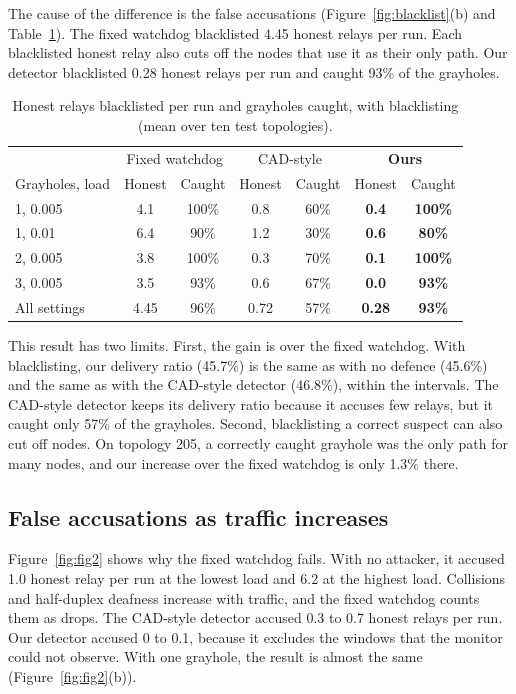 \documentclass[11pt]{article}
\begin{document}
\noindent
The cause of the difference is the false accusations (Figure~\ref{fig:blacklist}(b) and Table~\ref{tab:blacklist-acc}).
The fixed watchdog blacklisted 4.45 honest relays per run.
Each blacklisted honest relay also cuts off the nodes that use it as their only path.
Our detector blacklisted 0.28 honest relays per run and caught 93\% of the grayholes.

\begin{table}[htbp]
\centering\small
\caption{Honest relays blacklisted per run and grayholes caught, with blacklisting (mean over ten test topologies).}\label{tab:blacklist-acc}
\begin{tabular}{l c c c c c c}
\toprule
 & \multicolumn{2}{c}{Fixed watchdog} & \multicolumn{2}{c}{CAD-style} & \multicolumn{2}{c}{\textbf{Ours}} \\
Grayholes, load & Honest & Caught & Honest & Caught & Honest & Caught \\
\midrule
1, 0.005 & 4.1 & 100\% & 0.8 & 60\% & \textbf{0.4} & \textbf{100\%} \\
1, 0.01 & 6.4 & 90\% & 1.2 & 30\% & \textbf{0.6} & \textbf{80\%} \\
2, 0.005 & 3.8 & 100\% & 0.3 & 70\% & \textbf{0.1} & \textbf{100\%} \\
3, 0.005 & 3.5 & 93\% & 0.6 & 67\% & \textbf{0.0} & \textbf{93\%} \\
\midrule
All settings & 4.45 & 96\% & 0.72 & 57\% & \textbf{0.28} & \textbf{93\%} \\
\bottomrule
\end{tabular}
\end{table}

\noindent
This result has two limits.
First, the gain is over the fixed watchdog.
With blacklisting, our delivery ratio (45.7\%) is the same as with no defence (45.6\%) and the same as with the CAD-style detector (46.8\%), within the intervals.
The CAD-style detector keeps its delivery ratio because it accuses few relays, but it caught only 57\% of the grayholes.
Second, blacklisting a correct suspect can also cut off nodes.
On topology 205, a correctly caught grayhole was the only path for many nodes, and our increase over the fixed watchdog is only 1.3\% there.

\subsection{False accusations as traffic increases}\label{sec:res-false}
\noindent
Figure~\ref{fig:fig2} shows why the fixed watchdog fails.
With no attacker, it accused 1.0 honest relay per run at the lowest load and 6.2 at the highest load.
Collisions and half-duplex deafness increase with traffic, and the fixed watchdog counts them as drops.
The CAD-style detector accused 0.3 to 0.7 honest relays per run.
Our detector accused 0 to 0.1, because it excludes the windows that the monitor could not observe.
With one grayhole, the result is almost the same (Figure~\ref{fig:fig2}(b)).
\end{document}
